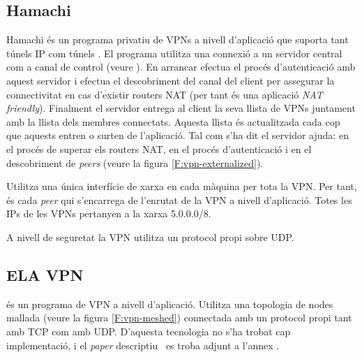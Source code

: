 \subsection{Hamachi}
Hamachi és un programa privatiu de VPNs a nivell d'aplicació que suporta tant túnels IP com túnels .
El programa utilitza una connexió a un servidor central com a canal de control (veure \cite{hamachi-web}). En arrancar efectua el procés d'autenticació amb aquest servidor i efectua el descobriment del canal del client per assegurar la connectivitat en cas d'existir routers NAT (per tant és una aplicació \emph{NAT friendly}). Finalment el servidor entrega al client la seva llista de VPNs juntament amb la llista dels membres connectats. Aquesta llista és actualitzada cada cop que aquests entren o surten de l'aplicació. Tal com s'ha dit el servidor ajuda: en el procés de superar els routers NAT, en el procés d'autenticació i en el descobriment de \emph{peers} (veure la figura \ref{F:vpn-externalized}).

Utilitza una única interfície de xarxa en cada màquina per tota la VPN. Per tant, és cada \emph{peer} qui s'encarrega de l'enrutat de la VPN a nivell d'aplicació. Totes les IPs de les VPNs pertanyen a la xarxa 5.0.0.0/8.

A nivell de seguretat la VPN utilitza un protocol propi sobre UDP.

\subsection{ELA VPN}
 és un programa de VPN a nivell d'aplicació.
Utilitza una topologia de nodes mallada (veure la figura \ref{F:vpn-meshed}) connectada amb un protocol propi tant amb TCP com amb UDP.
D'aquesta tecnologia no s'ha trobat cap implementació, i el \emph{paper} descriptiu~\cite{ela} es troba adjunt a l'annex .

